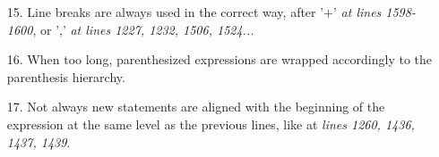 \begin{itemize}
\item [15.] Line breaks are always used in the correct way, after '+' \textit{at lines 1598-1600}, or ',' \textit{ at lines 1227, 1232, 1506, 1524...}
\item [16.] When too long, parenthesized expressions are wrapped accordingly to the parenthesis hierarchy.
\item [17.] Not always new statements are aligned with the beginning of the expression at the same level as the previous lines, like at \textit{lines 1260, 1436, 1437, 1439}.
\end{itemize}